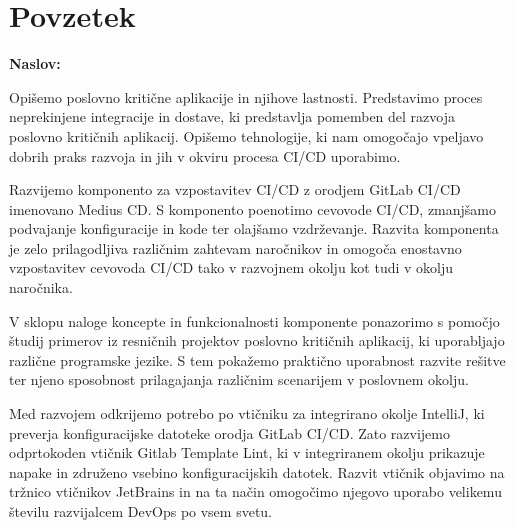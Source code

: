 \chapter*{Povzetek}

\noindent\textbf{Naslov:} \ttitle
\bigskip

Opišemo poslovno kritične aplikacije in njihove lastnosti. Predstavimo proces neprekinjene integracije in dostave, ki predstavlja pomemben del razvoja poslovno kritičnih aplikacij. Opišemo tehnologije, ki nam omogočajo vpeljavo dobrih praks razvoja in jih v okviru procesa CI/CD uporabimo.

Razvijemo komponento za vzpostavitev CI/CD z orodjem GitLab CI/CD imenovano Medius CD. S komponento poenotimo cevovode CI/CD, zmanjšamo podvajanje konfiguracije in kode ter olajšamo vzdrževanje. Razvita komponenta je zelo prilagodljiva različnim zahtevam naročnikov in omogoča enostavno vzpostavitev cevovoda CI/CD tako v razvojnem okolju kot tudi v okolju naročnika.

V sklopu naloge koncepte in funkcionalnosti komponente ponazorimo s pomočjo študij primerov iz resničnih projektov poslovno kritičnih aplikacij, ki uporabljajo različne programske jezike. S tem pokažemo praktično uporabnost razvite rešitve ter njeno sposobnost prilagajanja različnim scenarijem v poslovnem okolju.

Med razvojem odkrijemo potrebo po vtičniku za integrirano okolje IntelliJ, ki preverja konfiguracijske datoteke orodja GitLab CI/CD. Zato razvijemo odprtokoden vtičnik Gitlab Template Lint, ki v integriranem okolju prikazuje napake in združeno vsebino konfiguracijskih datotek. Razvit vtičnik objavimo na tržnico vtičnikov JetBrains in na ta način omogočimo njegovo uporabo velikemu številu razvijalcem DevOps po vsem svetu.




